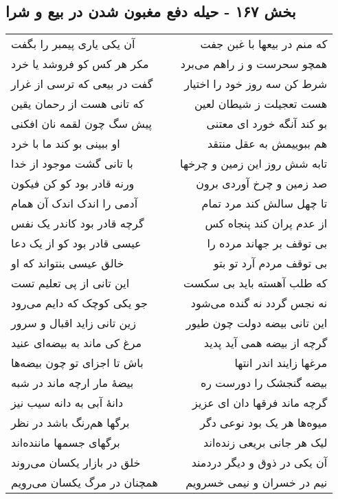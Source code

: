 \begin{center}
\section*{بخش ۱۶۷ - حیله دفع مغبون شدن در بیع و شرا}
\label{sec:sh167}
\begin{longtable}{l p{0.5cm} r}
آن یکی یاری پیمبر را بگفت
&&
که منم در بیعها با غبن جفت
\\
مکر هر کس کو فروشد یا خرد
&&
همچو سحرست و ز راهم می‌برد
\\
گفت در بیعی که ترسی از غرار
&&
شرط کن سه روز خود را اختیار
\\
که تانی هست از رحمان یقین
&&
هست تعجیلت ز شیطان لعین
\\
پیش سگ چون لقمه نان افکنی
&&
بو کند آنگه خورد ای معتنی
\\
او ببینی بو کند ما با خرد
&&
هم ببوییمش به عقل منتقد
\\
با تانی گشت موجود از خدا
&&
تابه شش روز این زمین و چرخها
\\
ورنه قادر بود کو کن فیکون
&&
صد زمین و چرخ آوردی برون
\\
آدمی را اندک اندک آن همام
&&
تا چهل سالش کند مرد تمام
\\
گرچه قادر بود کاندر یک نفس
&&
از عدم پران کند پنجاه کس
\\
عیسی قادر بود کو از یک دعا
&&
بی توقف بر جهاند مرده را
\\
خالق عیسی بنتواند که او
&&
بی توقف مردم آرد تو بتو
\\
این تانی از پی تعلیم تست
&&
که طلب آهسته باید بی سکست
\\
جو یکی کوچک که دایم می‌رود
&&
نه نجس گردد نه گنده می‌شود
\\
زین تانی زاید اقبال و سرور
&&
این تانی بیضه دولت چون طیور
\\
مرغ کی ماند به بیضه‌ای عنید
&&
گرچه از بیضه همی آید پدید
\\
باش تا اجزای تو چون بیضه‌ها
&&
مرغها زایند اندر انتها
\\
بیضهٔ مار ارچه ماند در شبه
&&
بیضه گنجشک را دورست ره
\\
دانهٔ آبی به دانه سیب نیز
&&
گرچه ماند فرقها دان ای عزیز
\\
برگها هم‌رنگ باشد در نظر
&&
میوه‌ها هر یک بود نوعی دگر
\\
برگهای جسمها ماننده‌اند
&&
لیک هر جانی بریعی زنده‌اند
\\
خلق در بازار یکسان می‌روند
&&
آن یکی در ذوق و دیگر دردمند
\\
همچنان در مرگ یکسان می‌رویم
&&
نیم در خسران و نیمی خسرویم
\\
\end{longtable}
\end{center}
